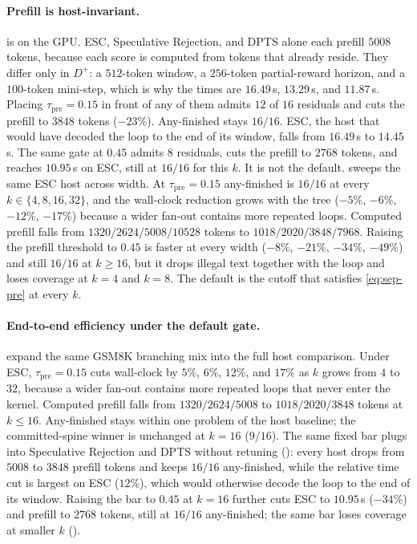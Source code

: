 \paragraph{Prefill is host-invariant.}
 is  on the GPU.
ESC, Speculative Rejection, and DPTS alone each prefill $5008$ tokens, because each score is computed from tokens that already reside.
They differ only in $D^{+}$: a $512$-token window, a $256$-token partial-reward horizon, and a $100$-token mini-step, which is why the times are $16.49$\,s, $13.29$\,s, and $11.87$\,s.
Placing $\tau_{\mathrm{pre}}{=}0.15$ in front of any of them admits $12$ of $16$ residuals and cuts the prefill to $3848$ tokens ($-23\%$).
Any-finished stays $16/16$.
ESC, the host that would have decoded the loop to the end of its window, falls from $16.49$\,s to $14.45$\,s.
The same gate at $0.45$ admits $8$ residuals, cuts the prefill to $2768$ tokens, and reaches $10.95$\,s on ESC, still at $16/16$ for this $k$.
It is not the default.
 sweeps the same ESC host across width.
At $\tau_{\mathrm{pre}}{=}0.15$ any-finished is $16/16$ at every $k\in\{4,8,16,32\}$, and the wall-clock reduction grows with the tree ($-5\%$, $-6\%$, $-12\%$, $-17\%$) because a wider fan-out contains more repeated loops.
Computed prefill falls from $1320/2624/5008/10528$ tokens to $1018/2020/3848/7968$.
Raising the prefill threshold to $0.45$ is faster at every width ($-8\%$, $-21\%$, $-34\%$, $-49\%$) and still $16/16$ at $k\ge16$, but it drops illegal text together with the loop and loses coverage at $k{=}4$ and $k{=}8$.
The default is the cutoff that satisfies \eqref{eq:sep-pre} at every $k$.

\paragraph{End-to-end efficiency under the default gate.}
 expand the same GSM8K branching mix into the full host comparison.
Under ESC, $\tau_{\mathrm{pre}}{=}0.15$ cuts wall-clock by $5\%$, $6\%$, $12\%$, and $17\%$ as $k$ grows from $4$ to $32$, because a wider fan-out contains more repeated loops that never enter the kernel.
Computed prefill falls from $1320/2624/5008$ to $1018/2020/3848$ tokens at $k\le16$.
Any-finished stays within one problem of the host baseline; the committed-spine winner is unchanged at $k{=}16$ ($9/16$).
The same fixed bar plugs into Speculative Rejection and DPTS without retuning (): every host drops from $5008$ to $3848$ prefill tokens and keeps $16/16$ any-finished, while the relative time cut is largest on ESC ($12\%$), which would otherwise decode the loop to the end of its window.
Raising the bar to $0.45$ at $k{=}16$ further cuts ESC to $10.95$\,s ($-34\%$) and prefill to $2768$ tokens, still at $16/16$ any-finished; the same bar loses coverage at smaller $k$ ().


